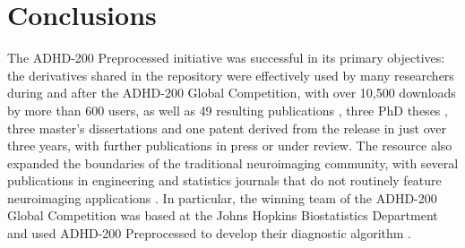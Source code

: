 \documentclass[preprint,12pt,3p]{elsarticle}
\begin{document}
\section{Conclusions}

The ADHD-200 Preprocessed initiative was successful in its primary objectives: the derivatives shared in the repository were effectively used by many researchers during and after the ADHD-200 Global Competition, with over 10,500 downloads by more than 600 users, as well as 49 resulting publications \cite{Rangarajan2014, Liang2012, Tabas2014, Rangarajan2015, Mahanand2013, Lifshitz2012, Fujita2013, Ji2011, Li2015, Li2013, Liu2012, DosSantosSiqueira2014, Olivetti2014, Han2015, Wang2013a, Subramanian2013, Dey2014, Bellec2012, Bohland2012, Chang2012, Cheng2012, Colby2012, Dai2012, Dey2012, Eloyan2012, Olivetti2012, Sato2012a, Carmona2015, Carmona2015a, Hou2015, Deshpande2015, She2014, Lavoie-Courchesne2012b, Chen2015, Nunez-Garcia2015, Solmaz2012, Anderson2014, KadkhodaeianBakhtiari2012, Sato2013, Kyeong2015, Sato2012, Takahashi2012, He2013, Kong2013, Yao2013, Yang2015, Ahn2015, Fujita2014, Reiss2014}, three PhD theses \cite{Colby2012a, Dey2013, Zhang2012}, three master's dissertations \cite{VanGalenLast2011, Vidal2014, Wang2013} and one patent \cite{Dey2013} derived from the release in just over three years, with further publications in press or under review. The resource also expanded the boundaries of the traditional neuroimaging community, with several publications in engineering and statistics journals that do not routinely feature neuroimaging applications \citep[e.g.][]{Liang2012, Rangarajan2015, Rangarajan2014, Mahanand2013, Ji2011, Li2015, Li2013, Liu2012, Subramanian2013, Hou2015, Deshpande2015, She2014, Chen2015, He2013, Kong2013, Yang2015, Ahn2015}. In particular, the winning team of the ADHD-200 Global Competition was based at the Johns Hopkins Biostatistics Department and used ADHD-200 Preprocessed to develop their diagnostic algorithm \cite{Eloyan2012}.

\end{document}
